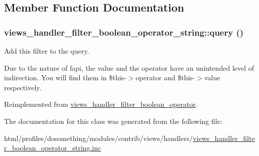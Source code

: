 \subsection{Member Function Documentation}
\hypertarget{classviews__handler__filter__boolean__operator__string_ad4d0444476749372e38591ad058ee1cd}{
\subsubsection[{query}]{\setlength{\rightskip}{0pt plus 5cm}views\_\-handler\_\-filter\_\-boolean\_\-operator\_\-string::query ()}}
\label{classviews__handler__filter__boolean__operator__string_ad4d0444476749372e38591ad058ee1cd}
Add this filter to the query.

Due to the nature of fapi, the value and the operator have an unintended level of indirection. You will find them in \$this-\/$>$operator and \$this-\/$>$value respectively. 

Reimplemented from \hyperlink{classviews__handler__filter__boolean__operator_ab3afc650701939c060e684d75fa2b21b}{views\_\-handler\_\-filter\_\-boolean\_\-operator}.

The documentation for this class was generated from the following file:\begin{DoxyCompactItemize}
\item 
html/profiles/dosomething/modules/contrib/views/handlers/\hyperlink{views__handler__filter__boolean__operator__string_8inc}{views\_\-handler\_\-filter\_\-boolean\_\-operator\_\-string.inc}\end{DoxyCompactItemize}

